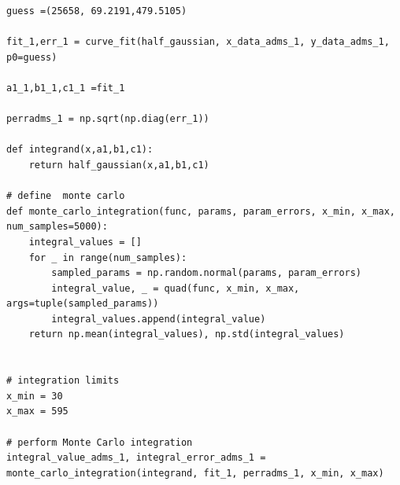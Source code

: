\documentclass[12pt]{article}
\begin{document}
\begin{lstlisting}
guess =(25658, 69.2191,479.5105)

fit_1,err_1 = curve_fit(half_gaussian, x_data_adms_1, y_data_adms_1, p0=guess)

a1_1,b1_1,c1_1 =fit_1
    
perradms_1 = np.sqrt(np.diag(err_1))

def integrand(x,a1,b1,c1):
    return half_gaussian(x,a1,b1,c1)

# define  monte carlo 
def monte_carlo_integration(func, params, param_errors, x_min, x_max, num_samples=5000):
    integral_values = []
    for _ in range(num_samples):
        sampled_params = np.random.normal(params, param_errors)
        integral_value, _ = quad(func, x_min, x_max, args=tuple(sampled_params))
        integral_values.append(integral_value)
    return np.mean(integral_values), np.std(integral_values)


# integration limits
x_min = 30
x_max = 595

# perform Monte Carlo integration
integral_value_adms_1, integral_error_adms_1 = monte_carlo_integration(integrand, fit_1, perradms_1, x_min, x_max)
\end{lstlisting}
\end{document}
